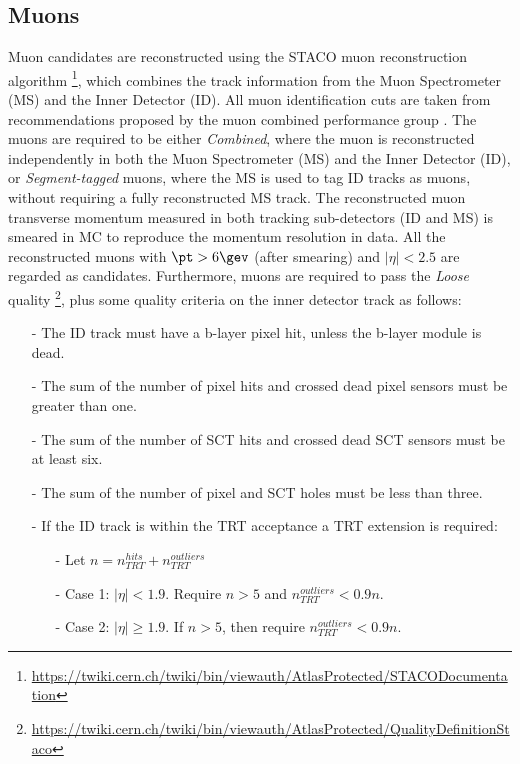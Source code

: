\subsection{Muons}
\label{sec:muon_obj}
Muon candidates are reconstructed using the STACO muon reconstruction algorithm \footnote{\url{https://twiki.cern.ch/twiki/bin/viewauth/AtlasProtected/STACODocumentation}}, which
combines the track information from the Muon
Spectrometer (MS) and the Inner Detector (ID). All
muon identification cuts are taken from recommendations proposed by
the muon combined performance group \cite{MCPTwiki}.
The muons are required to be either \textit{Combined}, where the muon
is reconstructed independently in both the Muon Spectrometer (MS) and
the Inner Detector (ID), or \textit{Segment-tagged} muons, where the
MS is used to tag ID tracks as muons, without requiring a fully
reconstructed MS track.
The reconstructed muon transverse momentum measured in both tracking sub-detectors (ID and MS) is smeared in MC to reproduce the momentum resolution in data.
All the reconstructed muons with $\pt>6 \gev$ (after smearing) and $|\eta|<2.5$ are regarded as candidates.
Furthermore, muons are required to pass the \textit{Loose} quality \footnote{\url{https://twiki.cern.ch/twiki/bin/viewauth/AtlasProtected/QualityDefinitionStaco}}, plus some quality criteria on the inner detector track as follows:
\begin{itemize}\itemsep0.1cm
\item[-] The ID track must have a b-layer pixel hit, unless the b-layer module is dead.
\item[-] The sum of the number of pixel hits and crossed dead pixel sensors must be greater than one.
\item[-] The sum of the number of SCT hits and crossed dead SCT sensors must be at least six.
\item[-] The sum of the number of pixel and SCT holes must be less than three.
\item[-] If the ID track is within the TRT acceptance a TRT extension is required:
\begin{itemize}\itemsep0.1cm
\item[-] Let $n = n_{TRT}^{hits} + n_{TRT}^{outliers}$
\item[-] Case 1: $|\eta| < 1.9$. Require $n > 5$ and $n_{TRT}^{outliers} < 0.9n$.
\item[-] Case 2: $|\eta| \geq 1.9$. If $n > 5$, then require $n_{TRT}^{outliers} < 0.9n$.
\end{itemize}
\end{itemize}

